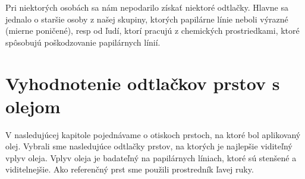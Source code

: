 \documentclass[12pt,a4paper,titlepage,final]{article}
\begin{document}
Pri niektorých osobách sa nám nepodarilo získať niektoré odtlačky. Hlavne sa jednalo o staršie osoby z našej skupiny, ktorých papilárne línie neboli výrazné (mierne poničené), resp od ľudí, ktorí pracujú z chemických prostriedkami, ktoré spôsobujú poškodzovanie papilárnych línií.


\section{Vyhodnotenie odtlačkov prstov s olejom}
V nasledujúcej kapitole pojednávame o otiskoch prstoch, na ktoré bol aplikovaný olej. Vybrali sme nasledujúce odtlačky prstov, na ktorých je najlepšie viditeľný vplyv oleja. Vplyv oleja je badateľný na papilárnych líniach, ktoré sú stenšené a viditelnejšie. Ako referenčný prst sme použili prostredník ľavej ruky.
\end{document}
